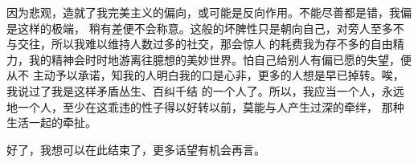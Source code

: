 \begin{adjustwidth}{0cm}{0cm}
{        \hspace*{2em} 因为悲观，造就了我完美主义的偏向，或可能是反向作用。不能尽善都是错，我偏是这样的极端，
        稍有差便不会称意。这般的坏脾性只是朝向自己，对旁人至多不与交往，所以我难以维持人数过多的社交，那会惊人
        的耗费我为存不多的自由精力，我的精神会时时地游离往臆想的美妙世界。怕自己给别人有偏已愿的失望，便从不
        主动予以承诺，知我的人明白我的口是心非，更多的人想是早已掉转。唉，我说过了我是这样矛盾丛生、百纠千结
        的一个人了。所以，我应当一个人，永远地一个人，至少在这乖违的性子得以好转以前，莫能与人产生过深的牵绊，
        那种生活一起的牵扯。

        \hspace*{2em} 好了，我想可以在此结束了，更多话望有机会再言。

}
\end{adjustwidth}
\newpage